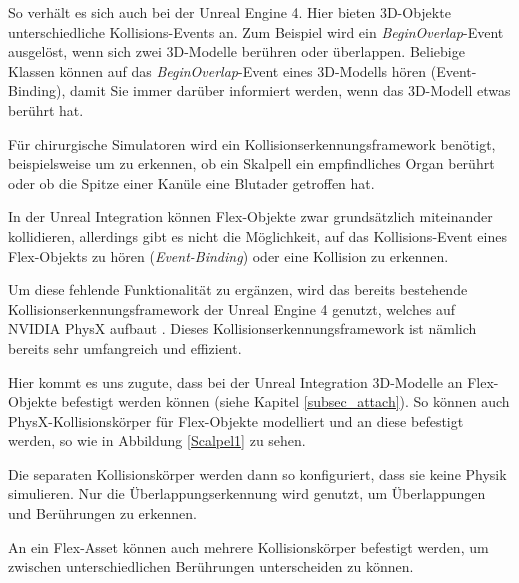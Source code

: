 So verhält es sich auch bei der Unreal Engine 4. Hier bieten 3D-Objekte unterschiedliche Kollisions-Events an. Zum Beispiel wird ein \textit{BeginOverlap}-Event ausgelöst, wenn sich zwei 3D-Modelle berühren oder überlappen. Beliebige Klassen können auf das \textit{BeginOverlap}-Event eines 3D-Modells hören (Event-Binding), damit Sie immer darüber informiert werden, wenn das 3D-Modell etwas berührt hat.

Für chirurgische Simulatoren wird ein Kollisionserkennungsframework benötigt, beispielsweise um zu erkennen, ob ein Skalpell ein empfindliches Organ berührt oder ob die Spitze einer Kanüle eine Blutader getroffen hat.

In der Unreal Integration können Flex-Objekte zwar grundsätzlich miteinander kollidieren, allerdings gibt es nicht die Möglichkeit, auf das Kollisions-Event eines Flex-Objekts zu hören (\textit{Event-Binding}) oder eine Kollision zu erkennen.

Um diese fehlende Funktionalität zu ergänzen, wird das bereits bestehende Kollisionserkennungsframework der Unreal Engine 4 genutzt, welches auf NVIDIA PhysX aufbaut \cite{ue4physics}. Dieses Kollisionserkennungsframework ist nämlich bereits sehr umfangreich und effizient.


Hier kommt es uns zugute, dass bei der Unreal Integration 3D-Modelle an Flex-Objekte befestigt werden können (siehe Kapitel \ref{subsec_attach}). So können auch PhysX-Kollisionskörper für Flex-Objekte modelliert und an diese befestigt werden, so wie in Abbildung \ref{Scalpel1} zu sehen.


Die separaten Kollisionskörper werden dann so konfiguriert, dass sie keine Physik simulieren. Nur die Überlappungserkennung wird genutzt, um Überlappungen und Berührungen zu erkennen.

An ein Flex-Asset können auch mehrere Kollisionskörper befestigt werden, um zwischen unterschiedlichen Berührungen unterscheiden zu können. 

